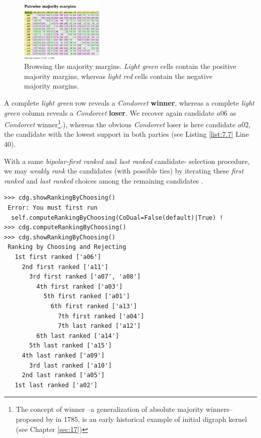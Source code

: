 \begin{figure}[h]
\sidecaption
\includegraphics[width=4cm]{Figures/majorityMargins.png}
\caption{Browsing the majority margins. \emph{Light green} cells contain the positive majority margins, whereas \emph{light red} cells contain the negative majority margins.}
\label{fig:7.4}       %
\end{figure}

A complete \emph{light green} row reveals a \emph{Condorcet} \textbf{winner}, whereas a complete \emph{light green} column reveals a \emph{Condorcet} \textbf{loser}. We recover again candidate $a06$ as \emph{Condorcet} winner\footnote{The concept of \Condorcet winner --a generalization of absolute majority winners-- proposed by \Condorcet in 1785, is an early historical example of initial digraph kernel (see Chapter \ref{sec:17})}.), whereas the obvious \emph{Condorcet} loser is here candidate $a02$, the candidate with the lowest support in both parties (see Listing \ref{list:7.7} Line 40).

With a same \emph{bipolar-first ranked} and \emph{last ranked} candidate- selection procedure, we may \emph{weakly rank} the candidates (with possible ties) by iterating these \emph{first ranked} and \emph{last ranked} choices among the remaining candidates \citep{BIS-1999}.

\begin{lstlisting}[caption={Ranking by iterating choosing the \emph{first} and \emph{last} remaining candidates },label=list:7.10,basicstyle=\footnotesize]
>>> cdg.showRankingByChoosing()
 Error: You must first run
  self.computeRankingByChoosing(CoDual=False(default)|True) !
>>> cdg.computeRankingByChoosing()
>>> cdg.showRankingByChoosing()
 Ranking by Choosing and Rejecting
   1st first ranked ['a06']
     2nd first ranked ['a11']
       3rd first ranked ['a07', 'a08']
         4th first ranked ['a03']
           5th first ranked ['a01']
             6th first ranked ['a13']
               7th first ranked ['a04']
               7th last ranked ['a12']
	     6th last ranked ['a14']
	   5th last ranked ['a15']
	 4th last ranked ['a09']
       3rd last ranked ['a10']
     2nd last ranked ['a05']
   1st last ranked ['a02']
\end{lstlisting}
 
